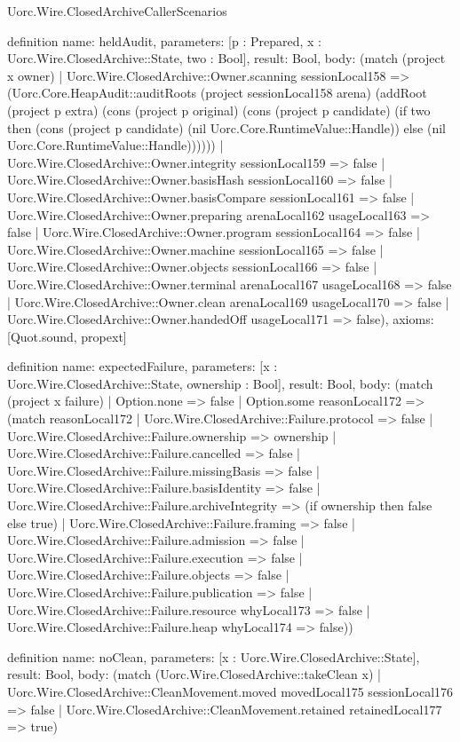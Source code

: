 \begin{lexlean}{Uorc.Wire.ClosedArchiveCallerScenarios}
\begin{semanticmodule}
definition{
  name: heldAudit,
  parameters: [p : Prepared, x : Uorc.Wire.ClosedArchive::State, two : Bool],
  result: Bool,
  body: (match (project x owner)
    | Uorc.Wire.ClosedArchive::Owner.scanning sessionLocal158 => (Uorc.Core.HeapAudit::auditRoots (project sessionLocal158 arena) (addRoot (project p extra) (cons (project p original) (cons (project p candidate) (if two then (cons (project p candidate) (nil Uorc.Core.RuntimeValue::Handle)) else (nil Uorc.Core.RuntimeValue::Handle))))))
    | Uorc.Wire.ClosedArchive::Owner.integrity sessionLocal159 => false
    | Uorc.Wire.ClosedArchive::Owner.basisHash sessionLocal160 => false
    | Uorc.Wire.ClosedArchive::Owner.basisCompare sessionLocal161 => false
    | Uorc.Wire.ClosedArchive::Owner.preparing arenaLocal162 usageLocal163 => false
    | Uorc.Wire.ClosedArchive::Owner.program sessionLocal164 => false
    | Uorc.Wire.ClosedArchive::Owner.machine sessionLocal165 => false
    | Uorc.Wire.ClosedArchive::Owner.objects sessionLocal166 => false
    | Uorc.Wire.ClosedArchive::Owner.terminal arenaLocal167 usageLocal168 => false
    | Uorc.Wire.ClosedArchive::Owner.clean arenaLocal169 usageLocal170 => false
    | Uorc.Wire.ClosedArchive::Owner.handedOff usageLocal171 => false),
  axioms: [Quot.sound, propext]
}

definition{
  name: expectedFailure,
  parameters: [x : Uorc.Wire.ClosedArchive::State, ownership : Bool],
  result: Bool,
  body: (match (project x failure)
    | Option.none => false
    | Option.some reasonLocal172 => (match reasonLocal172
      | Uorc.Wire.ClosedArchive::Failure.protocol => false
      | Uorc.Wire.ClosedArchive::Failure.ownership => ownership
      | Uorc.Wire.ClosedArchive::Failure.cancelled => false
      | Uorc.Wire.ClosedArchive::Failure.missingBasis => false
      | Uorc.Wire.ClosedArchive::Failure.basisIdentity => false
      | Uorc.Wire.ClosedArchive::Failure.archiveIntegrity => (if ownership then false else true)
      | Uorc.Wire.ClosedArchive::Failure.framing => false
      | Uorc.Wire.ClosedArchive::Failure.admission => false
      | Uorc.Wire.ClosedArchive::Failure.execution => false
      | Uorc.Wire.ClosedArchive::Failure.objects => false
      | Uorc.Wire.ClosedArchive::Failure.publication => false
      | Uorc.Wire.ClosedArchive::Failure.resource whyLocal173 => false
      | Uorc.Wire.ClosedArchive::Failure.heap whyLocal174 => false))
}

definition{
  name: noClean,
  parameters: [x : Uorc.Wire.ClosedArchive::State],
  result: Bool,
  body: (match (Uorc.Wire.ClosedArchive::takeClean x)
    | Uorc.Wire.ClosedArchive::CleanMovement.moved movedLocal175 sessionLocal176 => false
    | Uorc.Wire.ClosedArchive::CleanMovement.retained retainedLocal177 => true)
}


\end{semanticmodule}
\end{lexlean}
